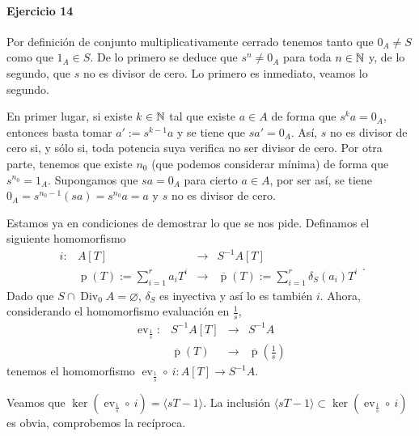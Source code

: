 \documentclass[./ejercicios.tex]{subfiles}
\begin{document}
\paragraph{Ejercicio 14} Por definición de conjunto multiplicativamente cerrado tenemos tanto que $0_A\neq S$ como que $1_A\in S$. De lo primero se deduce que $s^n\neq 0_A$ para toda $n\in\mathbb{N}$ y, de lo segundo, que $s$ no es divisor de cero. Lo primero es inmediato, veamos lo segundo.

En primer lugar, si existe $k\in\mathbb{N}$ tal que existe $a\in A$ de forma que $s^ka=0_A$, entonces basta tomar $a':=s^{k-1}a$ y se tiene que $sa'=0_A$. Así, $s$ no es divisor de cero si, y sólo si, toda potencia suya verifica no ser divisor de cero. Por otra parte, tenemos que existe $n_0$ (que podemos considerar mínima) de forma que $s^{n_0}=1_A$. Supongamos que $sa=0_A$ para cierto $a\in A$, por ser así, se tiene $0_A=s^{n_0-1}(sa)=s^{n_0}a=a$ y $s$ no es divisor de cero.

Estamos ya en condiciones de demostrar lo que se nos pide. Definamos el siguiente homomorfismo
$$\begin{array}{rrcl}
i:&A[T]&\longrightarrow&S^{-1}A[T]\\
&\operatorname{p}(T):=\sum_{i=1}^ra_iT^i&\longrightarrow&\overline{\operatorname{p}}(T):=\sum_{i=1}^r\delta_S(a_i)T^i
\end{array}.$$
Dado que $S\cap\operatorname{Div}_0A=\varnothing$, $\delta_S$ es inyectiva y así lo es también $i$. Ahora, considerando el homomorfismo evaluación en $\frac{1}{s}$,
$$\begin{array}{rrcl}
\operatorname{ev}_{\frac{1}{s}}:&S^{-1}A[T]&\longrightarrow&S^{-1}A\\
&\overline{\operatorname{p}}(T)&\longrightarrow&\overline{\operatorname{p}}\left(\frac{1}{s}\right) 
\end{array}$$
tenemos el homomorfismo $\operatorname{ev}_{\frac{1}{s}}\circ\  i:A[T]\longrightarrow S^{-1}A.$

Veamos que $\ker(\operatorname{ev}_{\frac{1}{s}}\circ\  i)=\langle sT-1\rangle.$ La inclusión $\langle sT-1\rangle\subset \ker(\operatorname{ev}_{\frac{1}{s}}\circ\  i)$ es obvia, comprobemos la recíproca.
\end{document}
